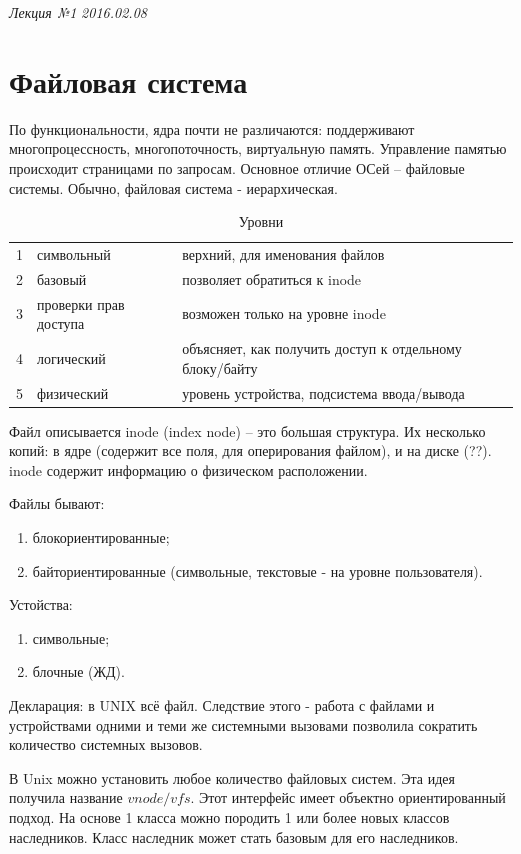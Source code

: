 \clearpage
\begin{flushright}
	\textit{Лекция №1}
	\textit{2016.02.08}
\end{flushright}

\chapter{Файловая система}
По функциональности, ядра почти не различаются: поддерживают многопроцессность, многопоточность, виртуальную память. Управление памятью происходит страницами по запросам. Основное отличие ОСей – файловые системы. Обычно, файловая система - иерархическая.

\begin{table}[H]
\caption{Уровни}
\begin{tabular}{|l|l|l|}
\hline
1 & символьный & верхний, для именования файлов\\
2 & базовый & позволяет обратиться к inode\\
3 & проверки прав доступа & возможен только на уровне inode\\
4 & логический & объясняет, как получить доступ к отдельному  блоку/байту\\
5 & физический & уровень устройства, подсистема ввода/вывода\\
\hline
\end{tabular}
\end{table}

Файл описывается inode (index node) – это большая структура. Их несколько копий: в ядре (содержит все поля, для оперирования файлом), и на диске (??). inode содержит информацию о физическом расположении.

Файлы бывают:
\begin{enumerate}
\item блокориентированные;
\item байториентированные (символьные, текстовые - на уровне пользователя).
\end{enumerate}

Устойства:
\begin{enumerate}
\item символьные;
\item блочные (ЖД).
\end{enumerate}

Декларация: в UNIX всё файл. Следствие этого - работа с файлами и устройствами одними и теми же системными вызовами позволила сократить количество системных вызовов.

В Unix можно установить любое количество файловых систем. Эта идея получила название $vnode/vfs$. Этот интерфейс имеет объектно ориентированный подход. На основе 1 класса можно породить 1 или более новых классов наследников. Класс наследник может стать базовым для его наследников.

